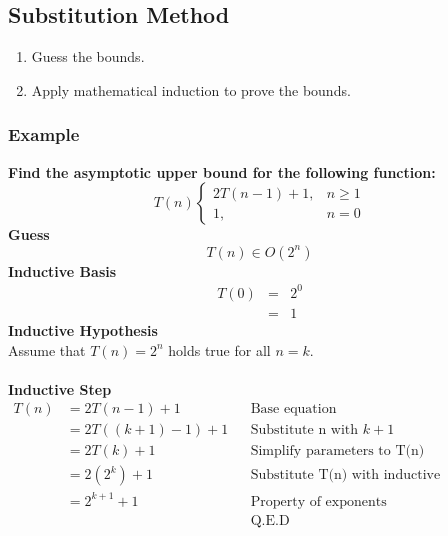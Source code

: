 \subsection{Substitution Method}
\begin{enumerate}
	\item Guess the bounds.
	\item Apply mathematical induction to prove the bounds. 
\end{enumerate}

\subsubsection{Example}
\textbf{Find the asymptotic upper bound for the following function:}
$$
T(n) \begin{cases}
	2T(n-1) + 1, & n \geq 1\\
	1, & n = 0
	\end{cases}
$$
\textbf{Guess}
$$T(n) \in O(2^n)$$
\textbf{Inductive Basis}
\begin{eqnarray*}
	T(0) &=& 2^0\\
	&=& 1
\end{eqnarray*}
\textbf{Inductive Hypothesis}\\
Assume that $T(n) = 2^n$ holds true for all $n = k$.\\\\
\textbf{Inductive Step}
\begin{align*}
T(n)	&=	2T(n-1) + 1						&& \text{Base equation}\\
		&= 	2T((k+1) - 1) + 1				&& \text{Substitute n with } k+1\\
		&=	2T(k) + 1						&& \text{Simplify parameters to T(n)}\\
		&=  2(2^k) + 1						&& \text{Substitute T(n) with inductive hypothesis}\\
		&=  2^{k+1} + 1						&& \text{Property of exponents}\\
&											&& \text{Q.E.D}
\end{align*}